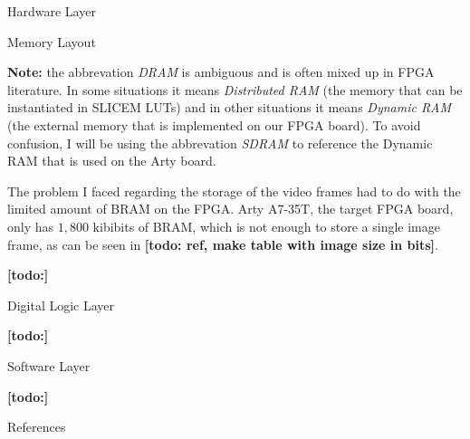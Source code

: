 \documentclass{matthijs}
\begin{document}
	\begin{hoofdstuk}{Hardware Layer}

		\begin{paragraaf}{Memory Layout}

			\textbf{Note:} the abbrevation \textit{DRAM} is ambiguous and is often mixed up in FPGA literature.
			In some situations it means \textit{Distributed RAM} (the memory that can be instantiated in SLICEM LUTs) and in other situations it means \textit{Dynamic RAM} (the external memory that is implemented on our FPGA board).
			To avoid confusion, I will be using the abbrevation \textit{SDRAM} to reference the Dynamic RAM that is used on the Arty board.

			\bigskip

			The problem I faced regarding the storage of the video frames had to do with the limited amount of BRAM on the FPGA.
			Arty A7-35T, the target FPGA board, only has $1,800$ kibibits of BRAM, which is not enough to store a single image frame, as can be seen in \textbf{[todo: ref, make table with image size in bits]}.


		\end{paragraaf}

		\textbf{[todo:]}

	\end{hoofdstuk}

	\begin{hoofdstuk}{Digital Logic Layer}

		\textbf{[todo:]}

	\end{hoofdstuk}
	
	\begin{hoofdstuk}{Software Layer}

		\textbf{[todo:]}

	\end{hoofdstuk}
	
	\begin{hoofdstuk}{References}

		\printbibliography[heading=none]

	\end{hoofdstuk}

	\clearpage
	\thispagestyle{empty}
	\addtocounter{page}{-1}
	\
	\clearpage
\end{document}
